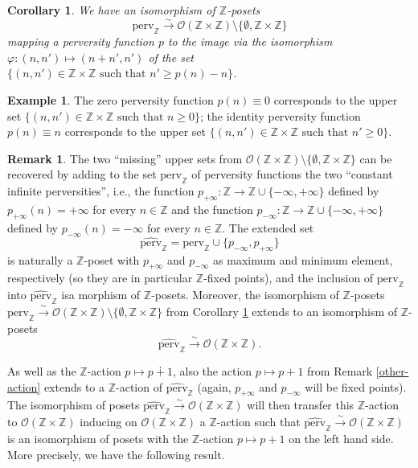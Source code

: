 \documentclass{article}
\newtheorem{cor}[thm]{Corollary}
\theoremstyle{definition}
\newtheorem{exmp}[thm]{Example}
\newtheorem{rem}[thm]{Remark}
\newcommand{\Z}{\mathbb{Z}}
\newcommand{\Oo}{\mathcal{O}}
\begin{document}
\begin{cor}\label{corperv}
We have an isomorphism of $\Z$-posets
\[
\mathrm{perv}_\Z\xrightarrow{\sim} \Oo(\Z\times \Z)\setminus\{\emptyset,\Z\times\Z\}
\]
mapping a perversity function $p$ to the image via the isomorphism $\varphi\colon (n,n')\mapsto (n+n',n')$ of the set $\{(n,n')\in \Z\times \Z\text{ such that } n'\geq p(n)-n\}$.
\end{cor}
\begin{exmp}
The zero perversity function $p(n)\equiv 0$ corresponds to the upper set $\{(n,n')\in \Z\times \Z\text{ such that } n\geq 0\}$; the identity perversity function $p(n)\equiv n$ corresponds to the upper set $\{(n,n')\in \Z\times \Z\text{ such that } n'\geq 0\}$.
\end{exmp}

\begin{rem}\label{missing}
The two ``missing'' upper sets from $\Oo(\Z\times \Z)\setminus\{\emptyset,\Z\times\Z\}$ can be recovered by adding to the set $\mathrm{perv}_\Z$ of perversity functions the two ``constant infinite perversities'', i.e., the function $p_{+\infty}\colon \Z\to \Z\cup\{-\infty,+\infty\}$ defined by $p_{+\infty}(n)=+\infty$ for every $n\in\Z$ and the function  $p_{-\infty}\colon \Z\to \Z\cup\{-\infty,+\infty\}$ defined by $p_{-\infty}(n)=-\infty$ for every $n\in\Z$. The extended set
\[
\widehat{\mathrm{perv}}_\Z =\mathrm{perv}_\Z\cup\{p_{-\infty},p_{+\infty}\}
\]
is naturally a $\Z$-poset with $p_{+\infty}$ and $p_{-\infty}$ as maximum and minimum element, respectively (so they are in particular $\Z$-fixed points), and the inclusion of $\mathrm{perv}_\Z$ into $\widehat{\mathrm{perv}}_\Z$ isa morphism of $\Z$-posets. Moreover, the isomorphism of $\Z$-posets $\mathrm{perv}_\Z\xrightarrow{\sim} \Oo(\Z\times \Z)\setminus\{\emptyset,\Z\times\Z\}$ from Corollary \ref{corperv} extends to an isomorphism of $\Z$-posets
\[
\widehat{\mathrm{perv}}_\Z\xrightarrow{\sim} \Oo(\Z\times \Z).
\]
\end{rem}
As well as the $\Z$-action $p\mapsto p\dotplus 1$, also the action $p\mapsto p+1$ from Remark \ref{other-action} extends to a $\Z$-action of $\widehat{\mathrm{perv}}_\Z$ (again, $p_{+\infty}$ and $p_{-\infty}$ will be fixed points). The isomorphism of posets $\widehat{\mathrm{perv}}_\Z\xrightarrow{\sim} \Oo(\Z\times \Z)$ will then transfer this $\Z$-action to $\Oo(\Z\times \Z)$ inducing on $\Oo(\Z\times \Z)$ a $\Z$-action such that $\widehat{\mathrm{perv}}_\Z\xrightarrow{\sim} \Oo(\Z\times \Z)$ is an isomorphism of posets with the $\Z$-action $p\mapsto p+1$ on the left hand side. More precisely, we have the following result.
\end{document}
